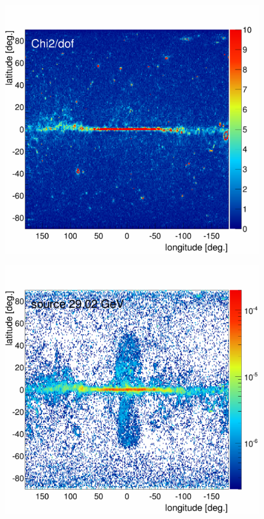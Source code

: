 \begin{figure}[h]
  \centering
  \begin{minipage}[h]{0.45\textwidth}
  	\centering
	\includegraphics[width=1.\linewidth]{pic/results/SCRonly_fine_chi2_distribution.png}
  	\label{fig:SCRonly_fit}
  \end{minipage}
  \hfill
  \begin{minipage}[h]{0.45\textwidth}
	  \centering
	  \includegraphics[width=1.\linewidth]{pic/results/SCRonly_fine_SCR_distribution_E20.png}

\end{minipage}
\end{figure}
